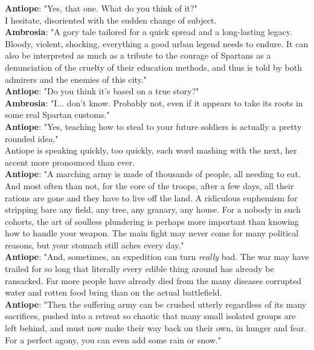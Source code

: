\documentclass{report}
\newcommand{\speaker}[1]{
	\textbf{#1}: 
}
\begin{document}
\speaker{Antiope} "Yes, that one. What do you think of it?"\\

I hesitate, disoriented with the sudden change of subject.\\

\speaker{Ambrosia} "A gory tale tailored for a quick spread and a long-lasting legacy. Bloody, violent, shocking, everything a good urban legend needs to endure. It can also be interpreted as much as a tribute to the courage of Spartans as a denunciation of the cruelty of their education methods, and thus is told by both admirers and the enemies of this city."\\

\speaker{Antiope} "Do you think it's based on a true story?"\\

\speaker{Ambrosia} "I... don't know. Probably not, even if it appears to take its roots in some real Spartan customs."\\

\speaker{Antiope} "Yes, teaching how to steal to your future soldiers is actually a pretty rounded idea."\\

Antiope is speaking quickly, too quickly, each word mashing with the next, her accent more pronounced than ever.\\

\speaker{Antiope} "A marching army is made of thousands of people, all needing to eat. And most often than not, for the core of the troops, after a few days, all their rations are gone and they have to live off the land. A ridiculous euphemism for stripping bare any field, any tree, any granary, any house. For a nobody in such cohorts, the art of soulless plundering is perhaps more important than knowing how to handle your weapon. The main fight may never come for many political reasons, but your stomach still aches every day."\\

\speaker{Antiope} "And, sometimes, an expedition can turn \emph{really} bad. The war may have trailed for so long that literally every edible thing around has already be ransacked. Far more people have already died from the many diseases corrupted water and rotten food bring than on the actual battlefield.\\

\speaker{Antiope} "Then the suffering army can be crushed utterly regardless of its many sacrifices, pushed into a retreat so chaotic that many small isolated groups are left behind, and must now make their way back on their own, in hunger and fear. For a perfect agony, you can even add some rain or snow."\\
\end{document}
